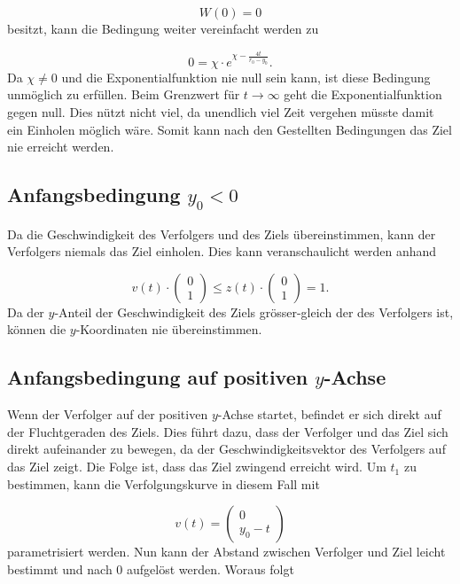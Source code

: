\begin{equation*}
    W(0)=0
\end{equation*}
%
besitzt, kann die Bedingung weiter vereinfacht werden zu

\begin{equation}
    0
    =
    \chi\cdot e^{\chi-\frac{4t}{r_0-y_0}}
    \text{.}
\end{equation}
%
Da $\chi\neq0$ und die Exponentialfunktion nie null sein kann, ist diese Bedingung unmöglich zu erfüllen.
Beim Grenzwert für $t\rightarrow\infty$ geht die Exponentialfunktion gegen null.
Dies nützt nicht viel, da unendlich viel Zeit vergehen müsste damit ein Einholen möglich wäre.
Somit kann nach den Gestellten Bedingungen das Ziel nie erreicht werden.

\subsection{Anfangsbedingung $y_0<0$}
Da die Geschwindigkeit des Verfolgers und des Ziels übereinstimmen, kann der Verfolgers niemals das Ziel einholen.
Dies kann veranschaulicht werden anhand

\begin{equation}
    v(t)\cdot \left( \begin{array}{c} 0 \\ 1 \end{array}\right) 
    \leq
    z(t)\cdot \left( \begin{array}{c} 0 \\ 1 \end{array}\right) 
    =
    1\text{.}
\end{equation}
%
Da der $y$-Anteil der Geschwindigkeit des Ziels grösser-gleich der des Verfolgers ist, können die $y$-Koordinaten nie übereinstimmen.

\subsection{Anfangsbedingung auf positiven $y$-Achse}
Wenn der Verfolger auf der positiven $y$-Achse startet, befindet er sich direkt auf der Fluchtgeraden des Ziels.
Dies führt dazu, dass der Verfolger und das Ziel sich direkt aufeinander zu bewegen, da der Geschwindigkeitsvektor des Verfolgers auf das Ziel zeigt.
Die Folge ist, dass das Ziel zwingend erreicht wird.
Um $t_1$ zu bestimmen, kann die Verfolgungskurve in diesem Fall mit

\begin{equation}
    v(t)
    =
    \left( \begin{array}{c} 0 \\ y_0-t \end{array} \right)
\end{equation}
%
parametrisiert werden.
Nun kann der Abstand zwischen Verfolger und Ziel leicht bestimmt und nach 0 aufgelöst werden.
Woraus folgt

